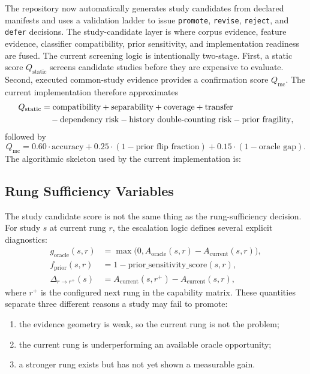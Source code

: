 \documentclass[11pt]{article}
\begin{document}
\noindent
The repository now automatically generates study candidates from declared manifests and uses a validation ladder to issue \texttt{promote}, \texttt{revise}, \texttt{reject}, and \texttt{defer} decisions. The study-candidate layer is where corpus evidence, feature evidence, classifier compatibility, prior sensitivity, and implementation readiness are fused.
The current screening logic is intentionally two-stage. First, a static score \(Q_{\text{static}}\) screens candidate studies before they are expensive to evaluate. Second, executed common-study evidence provides a confirmation score \(Q_{\text{mc}}\). The current implementation therefore approximates
\begin{align}
Q_{\text{static}}
&=
\text{compatibility} + \text{separability} + \text{coverage} + \text{transfer}
\notag \\
&\quad - \text{dependency risk} - \text{history double-counting risk} - \text{prior fragility},
\end{align}
followed by
\begin{equation}
Q_{\text{mc}} = 0.60 \cdot \text{accuracy} + 0.25 \cdot (1 - \text{prior flip fraction}) + 0.15 \cdot (1 - \text{oracle gap}).
\end{equation}
The algorithmic skeleton used by the current implementation is:


\subsection{Rung Sufficiency Variables}
The study candidate score is not the same thing as the rung-sufficiency
decision. For study \(s\) at current rung \(r\), the escalation logic defines
several explicit diagnostics:
\begin{align}
g_{\text{oracle}}(s,r)
&=
\max\!\bigl(0, A_{\text{oracle}}(s,r) - A_{\text{current}}(s,r)\bigr), \\
f_{\text{prior}}(s,r)
&=
1 - \text{prior\_sensitivity\_score}(s,r), \\
\Delta_{r \rightarrow r^+}(s)
&=
A_{\text{current}}(s,r^+) - A_{\text{current}}(s,r),
\end{align}
where \(r^+\) is the configured next rung in the capability matrix. These
quantities separate three different reasons a study may fail to promote:
\begin{enumerate}[leftmargin=1.5em]
  \item the evidence geometry is weak, so the current rung is not the problem;
  \item the current rung is underperforming an available oracle opportunity;
  \item a stronger rung exists but has not yet shown a measurable gain.
\end{enumerate}
\end{document}
